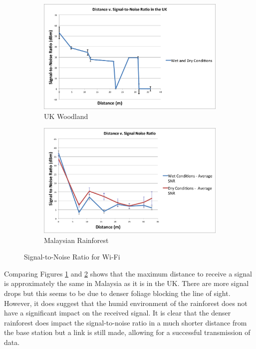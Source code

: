 \begin{figure}[ht!]
\centering
\begin{subfigure}{0.9\textwidth}
  \centering
  \includegraphics[width=\textwidth]{Chap3/figures/bp_snr.png}
  \caption{UK Woodland}
	\label{cardiffsnr}
\end{subfigure}
\begin{subfigure}{0.9\textwidth}
  \centering
  \includegraphics[width=\textwidth]{Chap3/figures/dg_snr.png}
  \caption{Malaysian Rainforest}
 \label{malaysiasnr}
\end{subfigure}
\caption{Signal-to-Noise Ratio for Wi-Fi}
\label{fig:test}
\end{figure}
						
			Comparing Figures \ref{cardiffsnr} and \ref{malaysiasnr} shows that the maximum distance to receive a signal is approximately the same in Malaysia as it is in the UK.  There are more signal drops but this seems to be due to denser foliage blocking the line of sight. However, it does suggest that the humid environment of the rainforest does not have a significant impact on the received signal. It is clear that the denser rainforest does impact the signal-to-noise ratio in a much shorter distance from the base station but a link is still made, allowing for a successful transmission of data.
			
